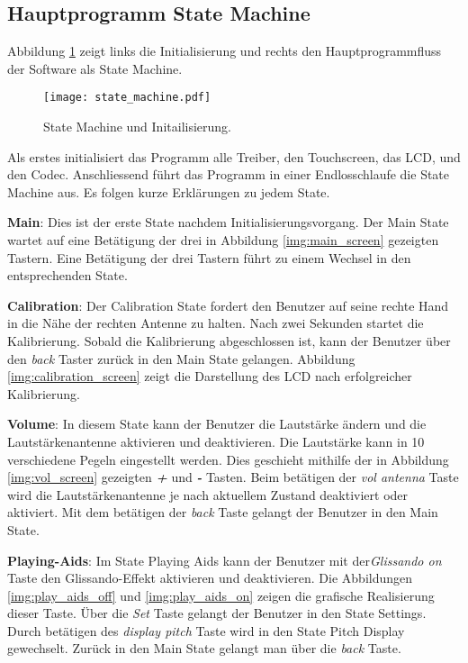 \subsection{Hauptprogramm State Machine}\label{subsec:State_Machine}
Abbildung \ref{img:state_machine} zeigt links die Initialisierung und rechts den Hauptprogrammfluss der Software als State Machine.
\begin{figure}[h]
	\centering
	\texttt{[image: state\_machine.pdf]}
	\caption{State Machine und Initailisierung.}
	\label{img:state_machine}
\end{figure}

Als erstes initialisiert das Programm alle Treiber, den Touchscreen, das LCD, und den Codec. Anschliessend führt das Programm in einer Endlosschlaufe die State Machine aus. Es folgen kurze Erklärungen zu jedem State.

\textbf{Main}:
Dies ist der erste State nachdem Initialisierungsvorgang. Der Main State wartet auf eine Betätigung der drei in Abbildung \ref{img:main_screen} gezeigten Tastern. Eine Betätigung der drei Tastern führt zu einem Wechsel in den entsprechenden State. 
 
\textbf{Calibration}:
Der Calibration State fordert den Benutzer auf seine rechte Hand in die Nähe der rechten Antenne zu halten.
Nach zwei Sekunden startet die Kalibrierung. Sobald die Kalibrierung abgeschlossen ist, kann der Benutzer über den \textit{back} Taster zurück in den Main State gelangen. Abbildung \ref{img:calibration_screen} zeigt die Darstellung des LCD nach erfolgreicher Kalibrierung.

\textbf{Volume}:
In diesem State kann der Benutzer die Lautstärke ändern und die Lautstärkenantenne aktivieren und deaktivieren. Die Lautstärke kann in 10 verschiedene Pegeln eingestellt werden. Dies geschieht mithilfe der in Abbildung \ref{img:vol_screen} gezeigten \textbf{\textit{+}} und \textbf{\textit{-}} Tasten. Beim betätigen der \textit{vol antenna} Taste wird die Lautstärkenantenne je nach aktuellem Zustand deaktiviert oder aktiviert. Mit dem betätigen der \textit{back} Taste gelangt der Benutzer in den Main State.
 
\textbf{Playing-Aids}:
Im State Playing Aids kann der Benutzer mit der\textit{Glissando on} Taste den Glissando-Effekt aktivieren und deaktivieren. Die Abbildungen \ref{img:play_aids_off} und \ref{img:play_aids_on} zeigen die grafische Realisierung dieser Taste. Über die \textit{Set} Taste gelangt der Benutzer in den State Settings. Durch betätigen des \textit{display pitch} Taste wird in den State Pitch Display gewechselt. Zurück in den Main State gelangt man über die \textit{back} Taste.

